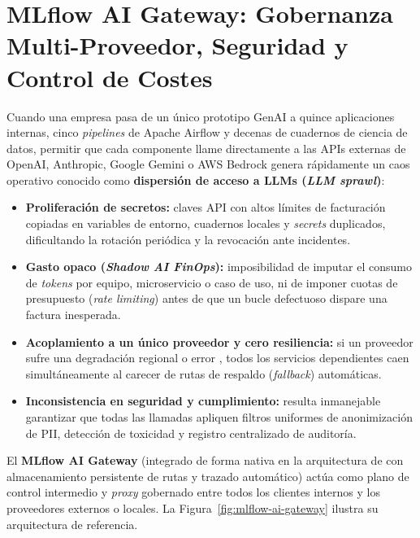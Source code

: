 \section[MLflow AI Gateway]{MLflow AI Gateway: Gobernanza Multi-Proveedor, Seguridad y Control de Costes}\label{sec:ai-gateway}

Cuando una empresa pasa de un único prototipo GenAI a quince aplicaciones internas, cinco \textit{pipelines} de Apache Airflow y decenas de cuadernos de ciencia de datos, permitir que cada componente llame directamente a las APIs externas de OpenAI, Anthropic, Google Gemini o AWS Bedrock genera rápidamente un caos operativo conocido como \textbf{dispersión de acceso a LLMs (\textit{LLM sprawl})}:

\begin{itemize}
  \item \textbf{Proliferación de secretos:} claves API con altos límites de facturación copiadas en variables de entorno, cuadernos locales y \textit{secrets} duplicados, dificultando la rotación periódica y la revocación ante incidentes.
  \item \textbf{Gasto opaco (\textit{Shadow AI FinOps}):} imposibilidad de imputar el consumo de \textit{tokens} por equipo, microservicio o caso de uso, ni de imponer cuotas de presupuesto (\textit{rate limiting}) antes de que un bucle defectuoso dispare una factura inesperada.
  \item \textbf{Acoplamiento a un único proveedor y cero resiliencia:} si un proveedor sufre una degradación regional o error , todos los servicios dependientes caen simultáneamente al carecer de rutas de respaldo (\textit{fallback}) automáticas.
  \item \textbf{Inconsistencia en seguridad y cumplimiento:} resulta inmanejable garantizar que todas las llamadas apliquen filtros uniformes de anonimización de PII, detección de toxicidad y registro centralizado de auditoría.
\end{itemize}

El \textbf{MLflow AI Gateway} (integrado de forma nativa en la arquitectura de  con almacenamiento persistente de rutas y trazado automático) actúa como plano de control intermedio y \textit{proxy} gobernado entre todos los clientes internos y los proveedores externos o locales. La Figura~\ref{fig:mlflow-ai-gateway} ilustra su arquitectura de referencia.

